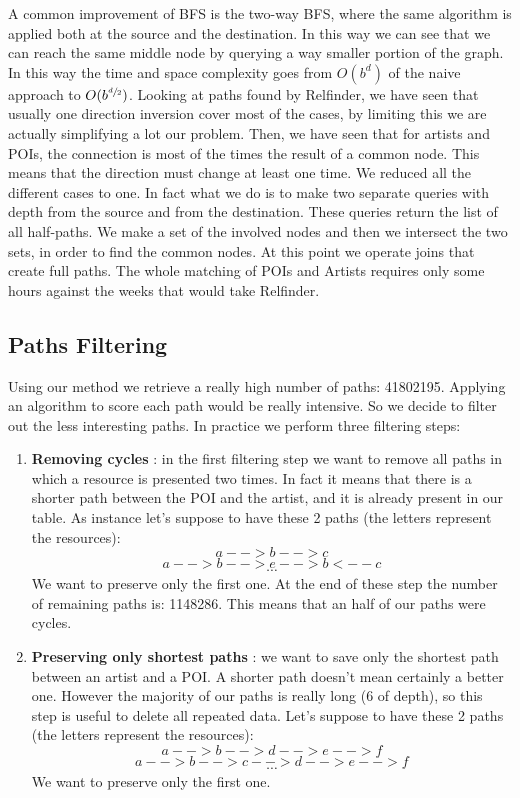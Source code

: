 \documentclass[paper=a4, fontsize=11pt]{scrartcl}
\begin{document}
A common improvement of BFS is the two-way BFS, where the same algorithm is applied both at the source and the destination. In this way we can see that we can reach the same middle node by querying a way smaller portion of the graph. In this way the time and space complexity goes from $O(b^d)$ of the naive approach to $O(b^{\sfrac{d}{2}})$.
Looking at paths found by Relfinder, we have seen that usually one direction inversion cover most of the cases, by limiting this we are actually simplifying a lot our problem. Then, we have seen that for artists and POIs, the connection is most of the times the result of a common node. This means that the direction must change at least one time. We reduced all the different cases to one. In fact what we do is to make two separate queries with depth from the source and from the destination. These queries return the list of all half-paths. We make a set of the involved nodes and then we intersect the two sets, in order to find the common nodes. At this point we operate joins that create full paths. The whole matching of POIs and Artists  requires only some hours against the weeks that would take Relfinder.

\subsection{Paths Filtering}
Using our method we retrieve a really high number of paths: 41802195. Applying an algorithm to score each path would be really intensive. So we decide to filter out the less interesting paths.
In practice we perform three filtering steps:
\begin{enumerate}
\item \textbf{Removing cycles} : in the  first filtering step we want to remove all paths in which a resource is presented two times. In fact it means that there is a shorter path between the POI and the artist, and it is already present in our table. As instance let's suppose to have these 2 paths (the letters represent the resources):
$$a-->b-->c$$
$$a-->b-->e-->b<--c$$
$$\cdots$$
We want to preserve only the first one. At the end of these step the number of remaining paths is: 1148286. This means that an half of our paths were cycles.

\item \textbf{Preserving only shortest paths} :  we want to save only the shortest path between an artist and a POI. A shorter path doesn't mean certainly a better one. However the majority of our paths is really long (6 of depth), so this step is useful to delete all repeated data. Let's suppose to have these 2 paths (the letters represent the resources):
$$a-->b-->d-->e-->f$$
$$a-->b-->c-->d-->e-->f$$
$$\cdots$$
We want to preserve only the first one.

\end{enumerate}
\end{document}
